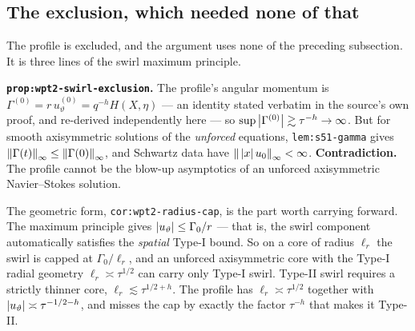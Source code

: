 \subsection{The exclusion, which needed none of that}

The profile is excluded, and the argument uses none of the preceding
subsection. It is three lines of the swirl maximum principle.

\begin{record}
\textbf{\texttt{prop:wpt2-swirl-exclusion}.} The profile's angular momentum is
\(\Gamma^{(0)}=r\,u_\vartheta^{(0)}=q^{-h}H(X,\eta)\) --- an identity stated
verbatim in the source's own proof, and re-derived independently here --- so
\(\sup\left|\Gamma^{(0)}\right|\gtrsim\tau^{-h}\to\infty\). But for smooth
axisymmetric solutions of the \emph{unforced} equations,
\texttt{lem:s51-gamma} gives \(\left\|\Gamma(t)\right\|_\infty\leq
\left\|\Gamma(0)\right\|_\infty\), and Schwartz data have
\(\left\|\,\left|x\right|u_0\right\|_\infty<\infty\). \textbf{Contradiction.} The profile
cannot be the blow-up asymptotics of an unforced axisymmetric Navier--Stokes
solution.
\end{record}

The geometric form, \texttt{cor:wpt2-radius-cap}, is the part worth carrying
forward. The maximum principle gives \(\left|u_\vartheta\right|\leq\Gamma_0/r\) ---
that is, the swirl component automatically satisfies the \emph{spatial} Type-I
bound. So on a core of radius \(\ell_r\) the swirl is capped at
\(\Gamma_0/\ell_r\), and an unforced axisymmetric core with the Type-I radial
geometry \(\ell_r\asymp\tau^{1/2}\) can carry only Type-I swirl. Type-II swirl
requires a strictly thinner core, \(\ell_r\lesssim\tau^{1/2+h}\). The profile
has \(\ell_r\asymp\tau^{1/2}\) together with
\(\left|u_\vartheta\right|\asymp\tau^{-1/2-h}\), and misses the cap by exactly the
factor \(\tau^{-h}\) that makes it Type-II.

